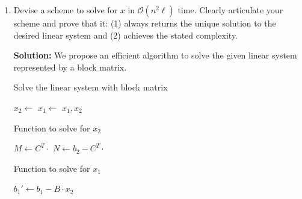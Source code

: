\documentclass[11pt,onecolumn]{article}
\newcommand{\cO}{\mathcal{O}}
\begin{document}
\begin{enumerate}[label=(\alph*)]
    \item Devise a scheme to solve for $x$ in $\cO(n^2\ell)$ time. Clearly articulate your scheme and prove that it: (1) always returns the unique solution to the desired linear system and (2) achieves the stated complexity.

          \textbf{Solution:}
          We propose an efficient algorithm to solve the given linear system represented by a block matrix.

          \begin{algorithm}
              \caption{Solve the linear system with block matrix}
              \begin{algorithmic}[1]
                  \State $x_2 \gets$ 
                  \State $x_1 \gets$ 
                  \State \Return $x_1, x_2$
                  \EndFunction
              \end{algorithmic}
          \end{algorithm}

          \begin{algorithm}
              \caption{Function to solve for \(x_2\)}
              \begin{algorithmic}[1]
                  \State $M \gets C^T \cdot$ 
                  \State $N \gets b_2 - C^T \cdot$ 
                  \State \Return {}
                  \EndFunction
              \end{algorithmic}
          \end{algorithm}

          \begin{algorithm}
              \caption{Function to solve for \(x_1\)}
              \begin{algorithmic}[1]
                  \State $b_1' \gets b_1 - B \cdot x_2$
                  \State \Return {}
                  \EndFunction
              \end{algorithmic}
          \end{algorithm}


\end{enumerate}
\end{document}

